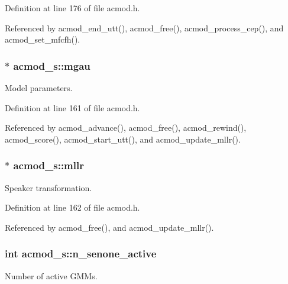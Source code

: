 \-Definition at line 176 of file acmod.\-h.



\-Referenced by acmod\-\_\-end\-\_\-utt(), acmod\-\_\-free(), acmod\-\_\-process\-\_\-cep(), and acmod\-\_\-set\-\_\-mfcfh().

\subsubsection[{mgau}]{$\ast$ {\bf acmod\-\_\-s\-::mgau}}\label{structacmod__s_a023addd9fe7252d87c683e02485cdafd}


\-Model parameters. 



\-Definition at line 161 of file acmod.\-h.



\-Referenced by acmod\-\_\-advance(), acmod\-\_\-free(), acmod\-\_\-rewind(), acmod\-\_\-score(), acmod\-\_\-start\-\_\-utt(), and acmod\-\_\-update\-\_\-mllr().

\subsubsection[{mllr}]{$\ast$ {\bf acmod\-\_\-s\-::mllr}}\label{structacmod__s_a4edbfa1a1324c6db27b74de7d0158e5e}


\-Speaker transformation. 



\-Definition at line 162 of file acmod.\-h.



\-Referenced by acmod\-\_\-free(), and acmod\-\_\-update\-\_\-mllr().

\subsubsection[{n\-\_\-senone\-\_\-active}]{\setlength{\rightskip}{0pt plus 5cm}int {\bf acmod\-\_\-s\-::n\-\_\-senone\-\_\-active}}\label{structacmod__s_a5081a507e3ca6de6c5695217245dc9f9}


\-Number of active \-G\-M\-Ms. 



